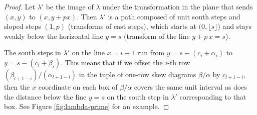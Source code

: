 \documentclass[12pt]{amsart}
\theoremstyle{definition}
\theoremstyle{remark}
\begin{document}
\begin{proof}
Let $\lambda '$ be the image of $\lambda $ under the transformation in
the plane that sends $(x,y)$ to $(x,y+px)$. Then $\lambda '$ is a path
composed of unit south steps and sloped steps $(1,p)$ (transforms of
east steps), which starts at $(0,\lfloor s \rfloor$) and stays weakly
below the horizontal line $y = s$ (transform of the line $y+p\, x=s$).

The south steps in $\lambda '$ on the line $x = i-1$ run from $y = s -
(c_{i} + \alpha _{i})$ to $y = s - (c_{i} + \beta _{i})$.  This means
that if we offset the $i$-th row $(\beta _{l+1-i})/(\alpha _{l+1-i})$
in the tuple of one-row skew diagrams $\beta /\alpha $ by $c_{l+1-i}$,
then the $x$ coordinate on each box of $\beta /\alpha $ covers the
same unit interval as does the distance below the line $y=s$ on the
south step in $\lambda '$ corresponding to that box.  See Figure
\ref{fig:lambda-prime} for an example.


\end{proof}
\end{document}
